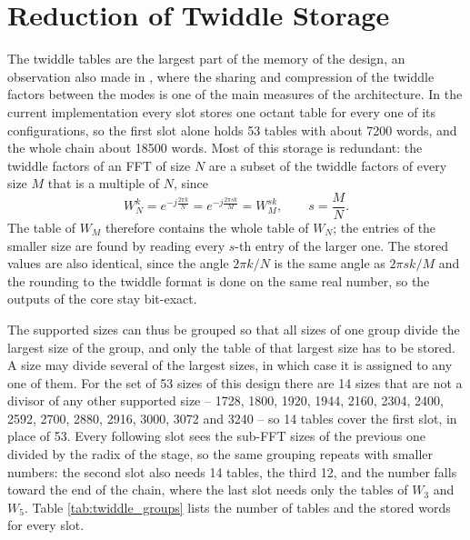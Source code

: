 \documentclass[a4paper,12pt, master]{etf}
\begin{document}
\section{Reduction of Twiddle Storage}
\label{sec:twiddle_reduction}

The twiddle tables are the largest part of the memory of the design, an observation also made in \cite{yang2023}, where the sharing and compression of the twiddle factors between the modes is one of the main measures of the architecture. In the current implementation every slot stores one octant table for every one of its configurations, so the first slot alone holds 53 tables with about 7200 words, and the whole chain about 18500 words. Most of this storage is redundant: the twiddle factors of an FFT of size $N$ are a subset of the twiddle factors of every size $M$ that is a multiple of $N$, since
\begin{equation}
    W_N^{k} = e^{-j \frac{2\pi k}{N}} = e^{-j \frac{2\pi s k}{M}} = W_M^{sk}, \qquad s = \frac{M}{N}.
    \label{eq:twiddle_stride}
\end{equation}
The table of $W_M$ therefore contains the whole table of $W_N$; the entries of the smaller size are found by reading every $s$-th entry of the larger one. The stored values are also identical, since the angle $2\pi k/N$ is the same angle as $2\pi s k/M$ and the rounding to the twiddle format is done on the same real number, so the outputs of the core stay bit-exact.

The supported sizes can thus be grouped so that all sizes of one group divide the largest size of the group, and only the table of that largest size has to be stored. A size may divide several of the largest sizes, in which case it is assigned to any one of them. For the set of 53 sizes of this design there are 14 sizes that are not a divisor of any other supported size -- 1728, 1800, 1920, 1944, 2160, 2304, 2400, 2592, 2700, 2880, 2916, 3000, 3072 and 3240 -- so 14 tables cover the first slot, in place of 53. Every following slot sees the sub-FFT sizes of the previous one divided by the radix of the stage, so the same grouping repeats with smaller numbers: the second slot also needs 14 tables, the third 12, and the number falls toward the end of the chain, where the last slot needs only the tables of $W_3$ and $W_5$. Table \ref{tab:twiddle_groups} lists the number of tables and the stored words for every slot.
\end{document}
